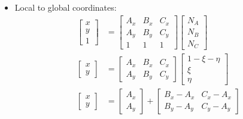 \documentclass[10pt]{article}
\begin{document}
\begin{itemize}
    \item Local to global coordinates:
        \begin{align}
            \begin{bmatrix}
                x \\
                y \\
                1
            \end{bmatrix}
            &=
            \begin{bmatrix}
                A_x & B_x & C_x \\
                A_y & B_y & C_y \\
                1 & 1 & 1
            \end{bmatrix} 
            \begin{bmatrix}
                N_A \\
                N_B \\
                N_C
            \end{bmatrix} \\
            \begin{bmatrix}
                x \\
                y 
            \end{bmatrix}
            &=
            \begin{bmatrix}
                A_x & B_x & C_x \\
                A_y & B_y & C_y
            \end{bmatrix} 
            \begin{bmatrix}
                1 - \xi - \eta \\
                \xi \\
                \eta
            \end{bmatrix} \\
            \begin{bmatrix}
                x \\
                y 
            \end{bmatrix}
            &=
            \begin{bmatrix}
                A_x \\
                A_y 
            \end{bmatrix}
            +
            \begin{bmatrix}
                B_x - A_x & C_x - A_x \\
                B_y - A_y & C_y - A_y
            \end{bmatrix} 

\end{align}
\end{itemize}
\end{document}
